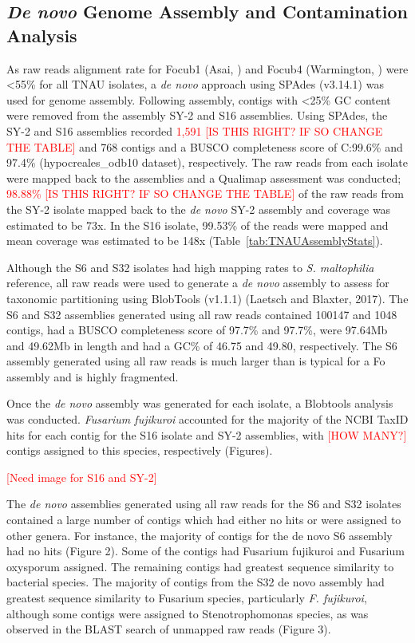 \subsection{\textit{De novo} Genome Assembly and Contamination Analysis}

As raw reads alignment rate for \ac{Focub1} (Asai, ) and \ac{Focub4} (Warmington, ) were <55\% for all TNAU isolates, a \textit{de novo} approach using SPAdes (v3.14.1) was used for genome assembly. Following assembly, contigs with \textless 25\% GC content were removed from the assembly SY-2 and S16 assemblies. Using SPAdes, the SY-2 and S16 assemblies recorded \textcolor{red}{1,591 [IS THIS RIGHT? IF SO CHANGE THE TABLE]} and 768 contigs and a BUSCO completeness score of C:99.6\% and 97.4\% (hypocreales\_odb10 dataset), respectively. The raw reads from each isolate were mapped back to the assemblies and a Qualimap assessment was conducted; \textcolor{red}{98.88\% [IS THIS RIGHT? IF SO CHANGE THE TABLE]} of the raw reads from the SY-2 isolate mapped back to the \textit{de novo} SY-2 assembly and coverage was estimated to be 73x. In the S16 isolate, 99.53\% of the reads were mapped and mean coverage was estimated to be 148x (Table~\ref{tab:TNAUAssemblyStats}).

Although the S6 and S32 isolates had high mapping rates to \textit{S. maltophilia} reference, all raw reads were used to generate a \textit{de novo} assembly to assess for taxonomic partitioning using BlobTools (v1.1.1) (Laetsch and Blaxter, 2017). The S6 and S32 assemblies generated using all raw reads contained 100147 and 1048 contigs, had a BUSCO completeness score of 97.7\% and 97.7\%, were 97.64Mb and 49.62Mb in length and had a GC\% of 46.75 and 49.80, respectively. The S6 assembly generated using all raw reads is much larger than is typical for a \ac{Fo} assembly and is highly fragmented. 

Once the \textit{de novo} assembly was generated for each isolate, a Blobtools analysis was conducted. \textit{Fusarium fujikuroi} accounted for the majority of the NCBI TaxID hits for each contig for the S16 isolate and SY-2 assemblies, with \textcolor{red}{[HOW MANY?]} contigs assigned to this species, respectively (Figures). 

\textcolor{red}{[Need image for S16 and SY-2]}

The \textit{de novo} assemblies generated using all raw reads for the S6 and S32 isolates contained a large number of contigs which had either no hits or were assigned to other genera. For instance, the majority of contigs for the de novo S6 assembly had no hits (Figure 2). Some of the contigs had Fusarium fujikuroi and Fusarium oxysporum assigned. The remaining contigs had greatest sequence similarity to bacterial species. The majority of contigs from the S32 de novo assembly had greatest sequence similarity to Fusarium species, particularly \textit{F. fujikuroi}, although some contigs were assigned to Stenotrophomonas species, as was observed in the BLAST search of unmapped raw reads (Figure 3). 


